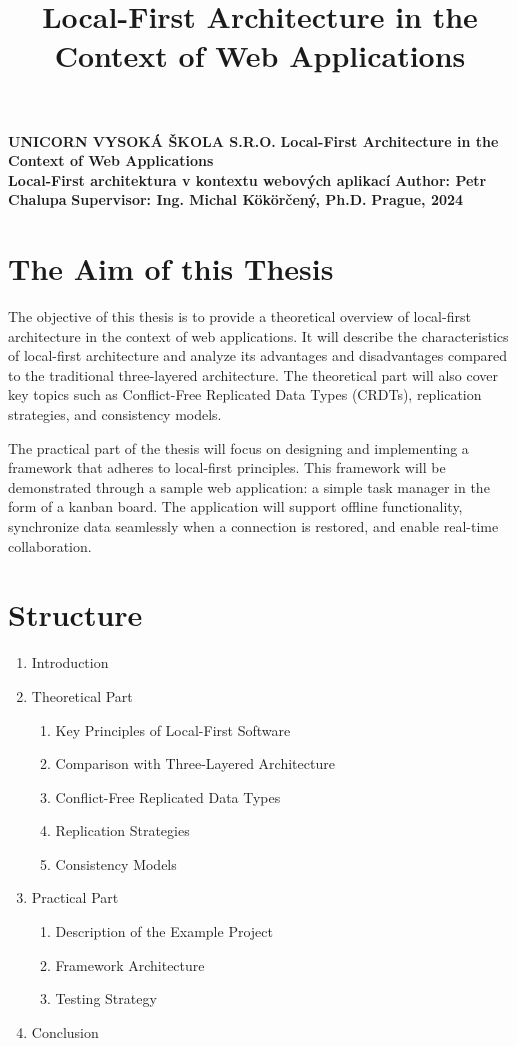 \documentclass{article}
\title{Local-First Architecture in the Context of Web Applications}
\begin{document}
	\begin{titlepage}
		\begin{center}
			\textbf{UNICORN VYSOKÁ ŠKOLA S.R.O.}
			\vfill
			\textbf{\LARGE Local-First Architecture in the Context of Web Applications\\}
			\vspace{5mm}
			\textbf{Local-First architektura v kontextu webových aplikací}
			\vfill
			\textbf{Author: Petr Chalupa}
			\vfill
			\textbf{Supervisor: Ing. Michal Kökörčený, Ph.D.}
			\vfill
			\textbf{Prague, 2024}
			\vfill
		\end{center}
	\end{titlepage}
	\newpage
	\section{The Aim of this Thesis}
	The objective of this thesis is to provide a theoretical overview of local-first architecture in the context of web applications. It will describe the characteristics of local-first architecture and analyze its advantages and disadvantages compared to the traditional three-layered architecture. The theoretical part will also cover key topics such as Conflict-Free Replicated Data Types (CRDTs), replication strategies, and consistency models.

	The practical part of the thesis will focus on designing and implementing a framework that adheres to local-first principles. This framework will be demonstrated through a sample web application: a simple task manager in the form of a kanban board. The application will support offline functionality, synchronize data seamlessly when a connection is restored, and enable real-time collaboration.

	\section{Structure}
	\begin{enumerate}
		\item Introduction
		\item Theoretical Part
		\begin{enumerate}[label=\arabic{enumi}.\arabic*]
			\item Key Principles of Local-First Software
			\item Comparison with Three-Layered Architecture
			\item Conflict-Free Replicated Data Types
			\item Replication Strategies
			\item Consistency Models
		\end{enumerate}
		\item Practical Part
		\begin{enumerate}[label=\arabic{enumi}.\arabic*]
			\item Description of the Example Project
			\item Framework Architecture
			\item Testing Strategy
		\end{enumerate}
		\item Conclusion
	\end{enumerate}
	\nocite{*}
	\printbibliography[title={Literature},heading=bibnumbered]
\end{document}
